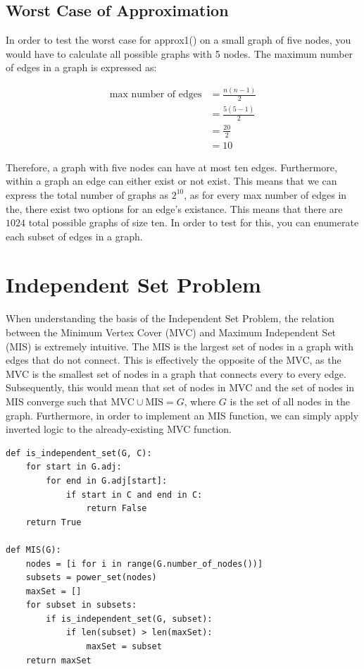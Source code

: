 \documentclass[letterpaper]{article}
\theoremstyle{plain}
\theoremstyle{definition}
\theoremstyle{remark}
\begin{document}
\subsection*{Worst Case of Approximation}

In order to test the worst case for approx1() on a small graph of five nodes, you would have to calculate all possible graphs with 5 nodes. The maximum number of edges in a graph is expressed as:

\begin{align*}
    \text{max number of edges} &= \frac{n(n-1)}{2}\\
    &= \frac{5(5-1)}{2}\\
    &= \frac{20}{2}\\
    &= 10
\end{align*}

Therefore, a graph with five nodes can have at most ten edges. Furthermore, within a graph an edge can either exist or not exist. This means that we can express the total number of graphs as $2^{10}$, as for every max number of edges in the, there exist two options for an edge's existance. This means that there are $1024$ total possible graphs of size ten. In order to test for this, you can enumerate each subset of edges in a graph. 

\section*{Independent Set Problem}

When understanding the basis of the Independent Set Problem, the relation between the Minimum Vertex Cover (MVC) and Maximum Independent Set (MIS) is extremely intuitive. The MIS is the largest set of nodes in a graph with edges that do not connect. This is effectively the opposite of the MVC, as the MVC is the smallest set of nodes in a graph that connects every to every edge. Subsequently, this would mean that set of nodes in MVC and the set of nodes in MIS converge such that $\text{MVC}\cup\text{MIS}=G$, where $G$ is the set of all nodes in the graph. Furthermore, in order to implement an MIS function, we can simply apply inverted logic to the already-existing MVC function.

\begin{verbatim}
def is_independent_set(G, C):
    for start in G.adj:
        for end in G.adj[start]:
            if start in C and end in C:
                return False
    return True

def MIS(G):
    nodes = [i for i in range(G.number_of_nodes())]
    subsets = power_set(nodes)
    maxSet = []
    for subset in subsets:
        if is_independent_set(G, subset):
            if len(subset) > len(maxSet):
                maxSet = subset
    return maxSet
\end{verbatim}
\end{document}
